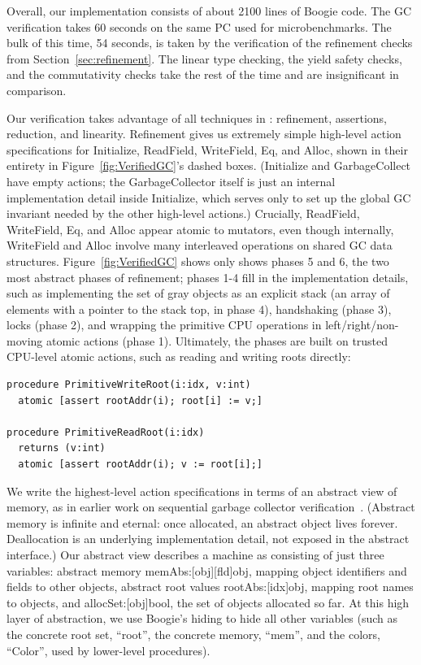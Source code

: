 Overall, our implementation consists of about 2100 lines of Boogie code.
The GC verification takes 60 seconds on the same PC used for microbenchmarks.
The bulk of this time, 54 seconds, is taken by the verification of the refinement checks from Section~\ref{sec:refinement}.
The linear type checking, the yield safety checks, and the commutativity checks take the rest of the time and are insignificant in comparison.

Our verification takes advantage of all techniques in \civl: refinement, assertions, reduction, and linearity.
Refinement gives us extremely simple high-level action specifications for Initialize, ReadField, WriteField, Eq, and Alloc,
shown in their entirety in Figure~\ref{fig:VerifiedGC}'s dashed boxes.
(Initialize and GarbageCollect have empty actions; the GarbageCollector itself is just an internal implementation detail inside Initialize,
which serves only to set up the global GC invariant needed by the other high-level actions.)
Crucially, ReadField, WriteField, Eq, and Alloc appear atomic to mutators, even though internally,
WriteField and Alloc involve many interleaved operations on shared GC data structures.
Figure~\ref{fig:VerifiedGC} shows only shows phases 5 and 6, the two most abstract phases of refinement;
phases 1-4 fill in the implementation details,
such as implementing the set of gray objects as an explicit stack (an array of elements with a pointer to the stack top, in phase 4),
handshaking (phase 3), locks (phase 2), and wrapping the primitive CPU operations in left/right/non-moving atomic actions (phase 1).
Ultimately, the phases are built on trusted CPU-level atomic actions, such as reading and writing roots directly:

\begin{verbatim}
procedure PrimitiveWriteRoot(i:idx, v:int)
  atomic [assert rootAddr(i); root[i] := v;]

procedure PrimitiveReadRoot(i:idx)
  returns (v:int)
  atomic [assert rootAddr(i); v := root[i];]
\end{verbatim}

We write the highest-level action specifications in terms of an abstract view of memory,
as in earlier work on sequential garbage collector verification~\cite{mccr07,hawb09}.
(Abstract memory is infinite and eternal: once allocated, an abstract object lives forever.
Deallocation is an underlying implementation detail, not exposed in the abstract interface.)
Our abstract view describes a machine as consisting of just three variables:
abstract memory memAbs:[obj][fld]obj, mapping object identifiers and fields to other objects,
abstract root values rootAbs:[idx]obj, mapping root names to objects, and
allocSet:[obj]bool, the set of objects allocated so far.
At this high layer of abstraction, we use Boogie's hiding to hide all other variables
(such as the concrete root set, ``root'', the concrete memory, ``mem'', and the colors, ``Color'', used by lower-level procedures).

